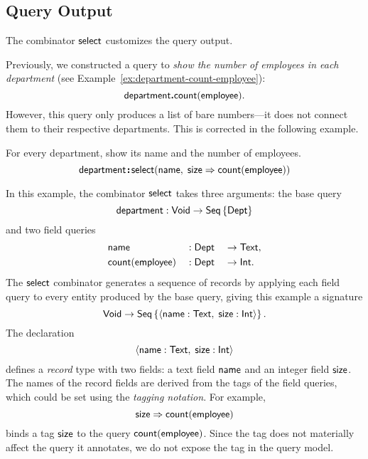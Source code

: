 \subsection*{Query Output}

The combinator $\textup{\textsf{select}}$ customizes the query output.

Previously, we constructed a query to \emph{show the number of employees in
each department} (see Example~\ref{ex:department-count-employee}):
\begin{equation*}
    \textup{\textsf{department}}\boldsymbol{.}\textup{\textsf{count}}(\textup{\textsf{employee}}).
\end{equation*}
However, this query only produces a list of bare numbers---it does not connect
them to their respective departments.  This is corrected in the following example.

\begin{example}
    \label{ex:department-select-name-size}
    For every department, show its name and the number of employees.
    \begin{equation*}
        \textup{\textsf{department}}
        \!\boldsymbol{:}\!\textup{\textsf{select}}(\textup{\textsf{name}},\;\textup{\textsf{size}}\Rightarrow\textup{\textsf{count}}(\textup{\textsf{employee}}))
    \end{equation*}
\end{example}

In this example, the combinator $\textup{\textsf{select}}$ takes three arguments: the base query
\begin{equation*}
    \textup{\textsf{department}} : \textup{\textsf{Void}} \to \textup{\textsf{Seq}}\left\{\textup{\textsf{Dept}}\right\}
\end{equation*}
and two field queries
\begin{alignat*}{3}
    & \textup{\textsf{name}} && : \textup{\textsf{Dept}} && \to \textup{\textsf{Text}}, \\
    & \textup{\textsf{count}}(\textup{\textsf{employee}}) && : \textup{\textsf{Dept}} && \to \textup{\textsf{Int}}.
\end{alignat*}
The $\textup{\textsf{select}}$ combinator generates a sequence of records by applying each field
query to every entity produced by the base query, giving this example a
signature
\begin{equation*}
    \textup{\textsf{Void}} \to \textup{\textsf{Seq}}\left\{\langle \textup{\textsf{name}}:\textup{\textsf{Text}},\; \textup{\textsf{size}}:\textup{\textsf{Int}} \rangle\right\}.
\end{equation*}
The declaration
\begin{equation*}
    \langle \textup{\textsf{name}}:\textup{\textsf{Text}},\; \textup{\textsf{size}}:\textup{\textsf{Int}} \rangle
\end{equation*}
defines a \emph{record} type with two fields: a text field $\textup{\textsf{name}}$ and an
integer field $\textup{\textsf{size}}$.  The names of the record fields are derived from the
tags of the field queries, which could be set using the \emph{tagging
notation}.  For example,
\begin{equation*}
    \textup{\textsf{size}} \Rightarrow \textup{\textsf{count}}(\textup{\textsf{employee}})
\end{equation*}
binds a tag $\textup{\textsf{size}}$ to the query $\textup{\textsf{count}}(\textup{\textsf{employee}})$.  Since the tag does not
materially affect the query it annotates, we do not expose the tag in the query
model.

